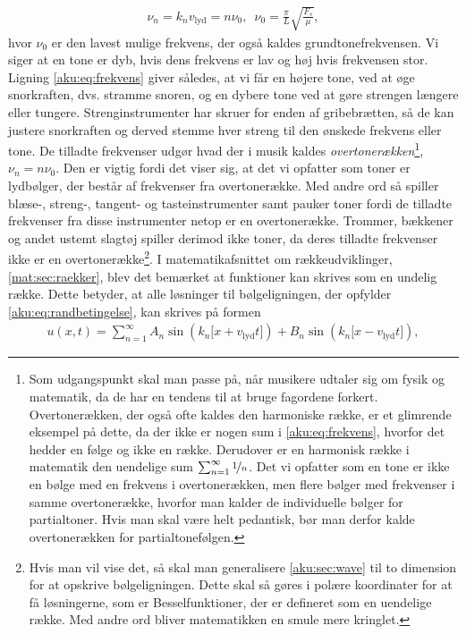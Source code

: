 %
\begin{align} \label{aku:eq:frekvens}
    \nu_n = k_nv_\mathrm{lyd} = n\nu_0, \enspace \nu_0=\frac{\pi}{L}\sqrt{\frac{F_s}{\mu}},
\end{align}
%
hvor $\nu_0$ er den lavest mulige frekvens, der også kaldes grundtonefrekvensen. Vi siger at en tone er dyb, hvis dens frekvens er lav og høj hvis frekvensen stor. Ligning \eqref{aku:eq:frekvens} giver således, at vi får en højere tone, ved at øge snorkraften, dvs. stramme snoren, og en dybere tone ved at gøre strengen længere eller tungere. Strenginstrumenter har skruer for enden af gribebrætten, så de kan justere snorkraften og derved stemme hver streng til den ønskede frekvens eller tone. De tilladte frekvenser udgør hvad der i musik kaldes \textit{overtonerækken}\footnote{Som udgangspunkt skal man passe på, når musikere udtaler sig om fysik og matematik, da de har en tendens til at bruge fagordene forkert. Overtonerækken, der også ofte kaldes den harmoniske række, er et glimrende eksempel på dette, da der ikke er nogen sum i \cref{aku:eq:frekvens}, hvorfor det hedder en følge og ikke en række. Derudover er en harmonisk række i matematik den uendelige sum $\sum_{n=1}^\infty \nicefrac{1}{n}$. Det vi opfatter som en tone er ikke en bølge med en frekvens i overtonerækken, men flere bølger med frekvenser i samme overtonerække, hvorfor man kalder de individuelle bølger for partialtoner. Hvis man skal være helt pedantisk, bør man derfor kalde overtonerækken for partialtonefølgen.}, $\nu_n=n\nu_0$. Den er vigtig fordi det viser sig, at det vi opfatter som toner er lydbølger, der består af frekvenser fra overtonerække. Med andre ord så spiller blæse-, streng-, tangent- og tasteinstrumenter samt pauker toner fordi de tilladte frekvenser fra disse instrumenter netop er en overtonerække. Trommer, bækkener og andet ustemt slagtøj spiller derimod ikke toner, da deres tilladte frekvenser ikke er en overtonerække\footnote{Hvis man vil vise det, så skal man generalisere \cref{aku:sec:wave} til to dimension for at opskrive bølgeligningen. Dette skal så gøres i polære koordinater for at få løsningerne, som er Besselfunktioner, der er defineret som en uendelige række. Med andre ord bliver matematikken en smule mere kringlet.}. I matematikafsnittet om rækkeudviklinger, \cref{mat:sec:raekker}, blev det bemærket at funktioner kan skrives som en undelig række. Dette betyder, at alle løsninger til bølgeligningen, der opfylder \cref{aku:eq:randbetingelse}, kan skrives på formen
%
\begin{align} \label{aku:eq:losning_1}
    u(x,t) = \sum_{n=1}^\infty A_n\sin\left(k_n\big[x + v_\mathrm{lyd}t\big]\right) + B_n\sin\left(k_n\big[x - v_\mathrm{lyd}t\big]\right),
\end{align}
